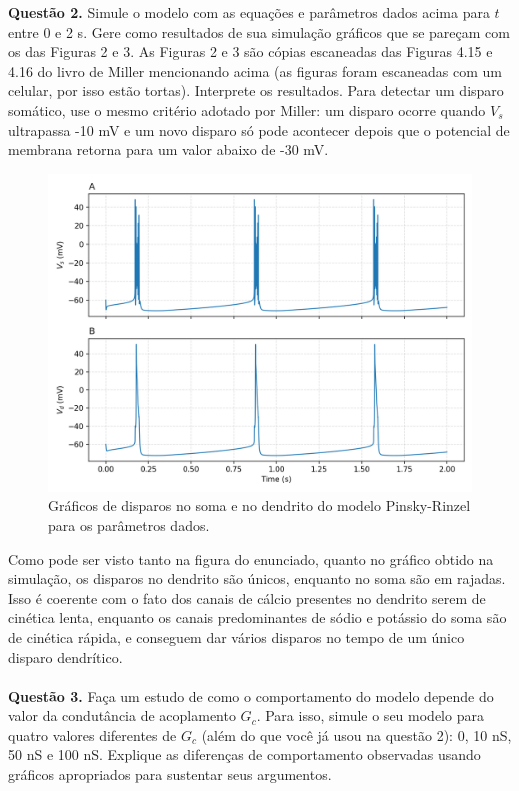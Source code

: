 \documentclass[english,11pt,a4paper]{article}
\begin{document}
	\noindent \textbf{Questão 2.} Simule o modelo com as equações e parâmetros dados acima para \(t\) entre 0 e 2 s. Gere como resultados de sua simulação gráficos que se pareçam com os das Figuras 2 e 3. As Figuras 2 e 3 são cópias escaneadas das Figuras 4.15 e 4.16 do livro de Miller mencionando acima (as figuras foram escaneadas com um celular, por isso estão tortas). Interprete os resultados. Para detectar um disparo somático, use o mesmo critério adotado por Miller: um disparo ocorre quando \(V_s\) ultrapassa -10 mV e um novo disparo só pode acontecer depois que o potencial de membrana retorna para um valor abaixo de -30 mV.
	
	\begin{figure}[H]
		\centering
		\includegraphics[width=12cm]{../figures/ex_2.png}
		\caption{Gráficos de disparos no soma e no dendrito do modelo Pinsky-Rinzel para os parâmetros dados.}
	\end{figure}
	
	Como pode ser visto tanto na figura do enunciado, quanto no gráfico obtido na simulação, os disparos no dendrito são únicos, enquanto no soma são em rajadas. Isso é coerente com o fato dos canais de cálcio presentes no dendrito serem de cinética lenta, enquanto os canais predominantes de sódio e potássio do soma são de cinética rápida, e conseguem dar vários disparos no tempo de um único disparo dendrítico.\\\\
	
	\noindent \textbf{Questão 3.} Faça um estudo de como o comportamento do modelo depende do valor da condutância de acoplamento \(G_c\). Para isso, simule o seu modelo para quatro valores diferentes de \(G_c\) (além do que você já usou na questão 2): 0, 10 nS, 50 nS e 100 nS. Explique as diferenças de comportamento observadas usando gráficos apropriados para sustentar seus argumentos.
	
\end{document}
